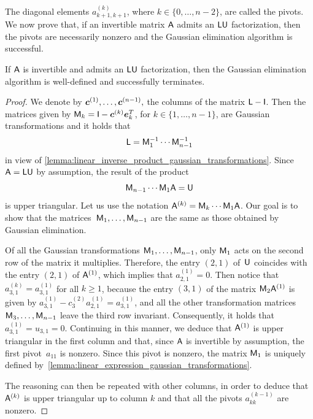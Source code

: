 The diagonal elements $a^{(k)}_{k+1,k+1}$, where $k \in \{0, \dots, n-2 \}$, are called the pivots.
We now prove that,
if an invertible matrix $\mathsf A$ admits an $\mathsf L \mathsf U$ factorization,
then the pivots are necessarily nonzero and the Gaussian elimination algorithm is successful.
\begin{proposition}
    \label{proposition:linear_uniqueness_lu}
    If $\mathsf A$ is invertible and admits an $\mathsf L \mathsf U$  factorization,
    then the Gaussian elimination algorithm is well-defined and successfully terminates.
\end{proposition}
\begin{proof}
    We denote by $\mathbf{\boldsymbol{c}}^{(1)}, \dotsc, \mathbf{\boldsymbol{c}}^{(n-1)},$ the columns of the matrix $\mathsf L - \mathsf I$.
    Then the matrices given by $\mathsf M_k = \mathsf I - \mathbf{\boldsymbol{c}}^{(k)} \mathbf{\boldsymbol{e}}_{k}^T$,
    for $k \in \{1, \dotsc, n-1 \}$,
    are Gaussian transformations and it holds that
    \[
        \mathsf L = \mathsf M_1^{-1} \dotsb  \mathsf M_{n-1}^{-1}
    \]
    in view of \cref{lemma:linear_inverse_product_gaussian_transformations}.
    Since $\mathsf A = \mathsf L \mathsf U$ by assumption,
    the result of the product
    \[
        \mathsf M_{n-1} \dotsb \mathsf M_1 \mathsf A = \mathsf U
    \]
    is upper triangular.
    Let us use the notation $\mathsf A^{(k)} = \mathsf M_{k} \dotsb \mathsf M_1 \mathsf A$.
    Our goal is to show that the matrices~$\mathsf M_1, \dotsc, \mathsf M_{n-1}$ are the same as those obtained by Gaussian elimination.

    Of all the Gaussian transformations $\mathsf M_1, \dotsc, \mathsf M_{n-1}$,
    only $\mathsf M_1$ acts on the second row of the matrix it multiplies.
    Therefore, the entry $(2, 1)$ of~$\mathsf U$ coincides with the entry $(2, 1)$ of $\mathsf A^{(1)}$,
    which implies that $a^{(1)}_{2,1} = 0$.
    Then notice that $a^{(k)}_{3,1} = a^{(1)}_{3, 1}$ for all $k \geq 1$,
    because the entry $(3, 1)$ of the matrix $\mathsf M_2 \mathsf A^{(1)}$ is given by $a^{(1)}_{3,1} - c^{(2)}_3 a^{(1)}_{2,1} = a^{(1)}_{3,1}$,
    and all the other transformation matrices $\mathsf M_3, \dotsc, \mathsf M_{n-1}$ leave the third row invariant.
    Consequently, it holds that $a^{(1)}_{3,1} = u_{3,1} = 0$.
    Continuing in this manner,
    we deduce that $\mathsf A^{(1)}$ is upper triangular in the first column and that,
    since $\mathsf A$ is invertible by assumption,
    the first pivot~$a_{11}$ is nonzero.
    Since this pivot is nonzero,
    the matrix $\mathsf M_1$ is uniquely defined by~\cref{lemma:linear_expression_gaussian_transformations}.

    The reasoning can then be repeated with other columns,
    in order to deduce that $\mathsf A^{(k)}$ is upper triangular up to column $k$ and that all the pivots $a^{(k-1)}_{kk}$ are nonzero.
\end{proof}


